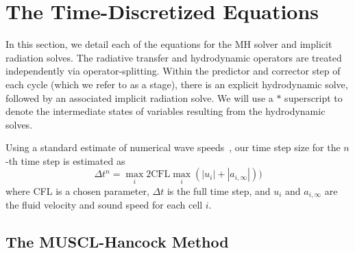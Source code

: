 \documentclass[preprint,12pt]{elsarticle}
\newcommand{\lsec}[1]{\label{sec:#1}}
\begin{document}
\section{The Time-Discretized Equations}\lsec{full}

In this section, we detail each of the equations for the MH solver and implicit radiation
solves.  The radiative transfer and hydrodynamic operators are treated independently via
operator-splitting.  Within the predictor and corrector step of each cycle (which we refer
to as a stage), there is an explicit hydrodynamic solve, followed by an associated implicit radiation solve. 
We will use a $*$ superscript to denote the intermediate states of variables resulting
from the hydrodynamic solves. 

Using a standard estimate of numerical wave speeds~\cite{toro}, our time step size for the $n$-th time
step is estimated as
\begin{equation}\label{eq:cfl}
    \Delta t^n = \max_{i} 2\text{CFL} \max_{i}\left(|u_i| + |a_{i,\infty}|\right))
\end{equation}
where CFL is a chosen parameter, $\Delta t$ is the full time step, and $u_i$ and $a_{i,\infty}$ are the fluid velocity
and sound speed for each cell $i$.

\subsection{The MUSCL-Hancock Method}
\end{document}
